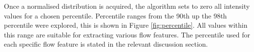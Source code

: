 Once a normalised distribution is acquired, the algorithm sets to zero all intensity values for a chosen percentile. Percentile ranges from the 90th up the 98th percentile were explored, this is shown in Figure \ref{fig:percentile}. All values within this range are suitable for extracting various flow features. The percentile used for each specific flow feature is stated in the relevant discussion section.

\begin{figure}[H]
  \centering
  \hfill
  \\

\end{figure}
